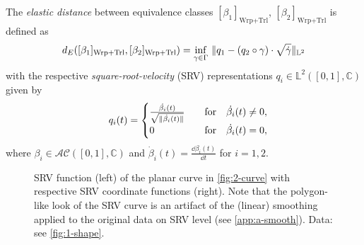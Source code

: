 \begin{definition}
  \label{def:2-eldist}
  The \emph{elastic distance} between equivalence classes $[\beta_1]_{\text{Wrp} + \text{Trl}}$, $[\beta_2]_{\text{Wrp} + \text{Trl}}$ is defined as
  \begin{equation}
    \label{eq:2-eldist-def}
    d_{E}([\beta_1]_\text{Wrp+Trl}, [\beta_2]_\text{Wrp+Trl}) = \inf_{\gamma \in \Gamma} \,\, \lVert q_1 - ( q_2 \circ \gamma) \cdot \sqrt{\dot\gamma}\rVert_{\mathbb{L}^2}
  \end{equation}
  with the respective \emph{square-root-velocity} (SRV) representations $q_i \in \mathbb{L}^2([0,1],\mathbb{C})$ given by 
  \begin{equation}
   \quad q_i(t) = 
    \begin{cases}
      \frac{\dot{\beta_i}(t)}{\sqrt{\lVert\dot{\beta_i}(t)\rVert}} & \quad\text{for}\quad\dot{\beta_i}(t) \neq 0, \\
      0 & \quad\text{for}\quad\dot{\beta_i}(t) = 0,
    \end{cases}
  \end{equation}
  where $\beta_i \in \mathcal{AC}([0,1], \mathbb{C})$ and $\dot\beta_i(t) = \frac{\dd\beta_i(t)}{\dd t}$ for $i=1,2$.
\end{definition}

\begin{figure}
  \centering
  \begin{subfigure}{.48\textwidth}
    \centering
  \end{subfigure}\hfill%
  \begin{subfigure}{.48\textwidth}
    \centering
    \begin{subfigure}{\textwidth}
      \centering
    \end{subfigure}
    \begin{subfigure}{\textwidth}
      \centering
    \end{subfigure}
  \end{subfigure}
  \caption{SRV function (left) of the planar curve in \cref{fig:2-curve} with respective SRV coordinate functions (right). Note that the polygon-like look of the SRV curve is an artifact of the (linear) smoothing applied to the original data on SRV level (see \cref{app:a-smooth}). Data: see \cref{fig:1-shape}.}
  \label{fig:2-srv}
\end{figure}

